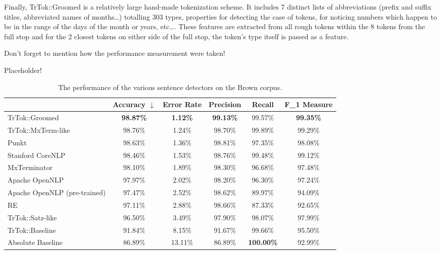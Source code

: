 Finally, TrTok::Groomed is a relatively large hand-made tokenization
scheme. It includes 7 distinct lists of abbreviations (prefix and
suffix titles, abbreviated names of months\ldots) totalling 303 types,
properties for detecting the case of tokens, for noticing numbers
which happen to be in the range of the days of the month or years,
etc\ldots. These features are extracted from all rough tokens within
the 8 tokens from the full stop and for the 2 closest tokens on either
side of the full stop, the token's type itself is passed as a feature.

Don't forget to mention how the performance measurement were taken!

Placeholder!\cite{sbd-punkt}

\begin{table*}
  \begin{center}
    \begin{tabular}{ | l | c | c | c | c | c | }
      \hline
      & Accuracy $\downarrow$ & Error Rate & Precision
      & Recall & F_1 Measure \\ \hline
      TrTok::Groomed & \textbf{98.87\%} & \textbf{1.12\%} & \textbf{99.13\%}
                     & 99.57\% & \textbf{99.35\%} \\ \hline
      TrTok::MxTerm-like & 98.76\% & 1.24\% & 98.70\%
                         & 99.89\% & 99.29\% \\ \hline
      Punkt & 98.63\% & 1.36\% & 98.81\%
            & 97.35\% & 98.08\% \\ \hline
      Stanford CoreNLP & 98.46\% & 1.53\% & 98.76\%
                       & 99.48\% & 99.12\% \\ \hline
      MxTerminator & 98.10\% & 1.89\% & 98.30\%
                   & 96.68\% & 97.48\% \\ \hline
      Apache OpenNLP & 97.97\% & 2.02\% & 98.20\%
                     & 96.30\% & 97.24\% \\ \hline
      Apache OpenNLP (pre-trained) & 97.47\% & 2.52\% & 98.62\%
                                   & 89.97\% & 94.09\% \\ \hline
      RE & 97.11\% & 2.88\% & 98.66\%
         & 87.33\% & 92.65\% \\ \hline
      TrTok::Satz-like & 96.50\% & 3.49\% & 97.90\%
                      & 98.07\% & 97.99\% \\ \hline
      TrTok::Baseline & 91.84\% & 8.15\% & 91.67\%
                      & 99.66\% & 95.50\% \\ \hline
      Absolute Baseline & 86.89\% & 13.11\% & 86.89\%
                        & \textbf{100.00\%} & 92.99\% \\ \hline
    \end{tabular}
  \end{center}
  \caption[Performance of sentence detectors on the Brown corpus]
    {The performance of the various sentence detectors on the Brown corpus.}
  \label{tbl:grand-melee}
\end{table*}

